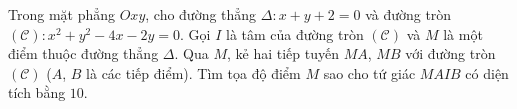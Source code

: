 \begin{bt}%
	Trong mặt phẳng $Oxy$, cho đường thẳng $\Delta :x+y+2=0$ và đường tròn $\mathscr{(C)}:x^2+y^2-4x-2y=0$. Gọi $I$ là tâm của đường tròn $\mathscr{(C)}$ và $M$ là một điểm thuộc đường thẳng $\Delta$. Qua $M$, kẻ hai tiếp tuyến $MA$, $MB$ với đường tròn $\mathscr{(C)}$ ($A$, $B$ là các tiếp điểm). Tìm tọa độ điểm $M$ sao cho tứ giác $MAIB$ có diện tích bằng $10$.
\end{bt}


